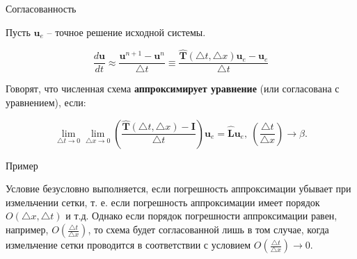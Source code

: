 \documentclass[10pt,xcolor=pst,aspectratio=169]{beamer}
\begin{document}
\begin{frame}{Согласованность}

    \transdissolve[duration=0.1]
    \justifying
    \large

    Пусть $\textbf{u}_{e}$ -- точное решение исходной системы.

    \[
        \frac{d \textbf{u}}{d t} \approx \frac{\textbf{u}^{n + 1} - \textbf{u}^{n}}{\triangle t} \equiv \frac{\hat{\textbf{T}} (\triangle t, \triangle x) \textbf{u}_{e} - \textbf{u}_{e}}{\triangle t}
    \]

    Говорят, что численная схема \textbf{аппроксимирует уравнение} (или согласована с уравнением), если:

\[
        \lim_{\triangle t \rightarrow 0} \lim_{\triangle x \rightarrow 0} \left( \frac{\hat{\textbf{T}} (\triangle t, \triangle x) - \textbf{I}}{\triangle t} \right) \textbf{u}_{e} = \hat{\textbf{L}} \textbf{u}_{e}, \: \left( \frac{\triangle t}{\triangle x} \right) \rightarrow \beta.
    \]



\end{frame}

\begin{frame}{Пример}

    \transdissolve[duration=0.1]
    \justifying
    \large

    Условие безусловно выполняется, если погрешность аппроксимации убывает при измельчении сетки, т. е. если погрешность аппроксимации имеет порядок $\mathit{O} \left( \triangle x, \triangle t \right)$ и т.д. Однако если порядок погрешности аппроксимации равен, например, $\mathit{O} \left( \frac{\triangle t}{\triangle x} \right)$, то схема будет согласованной лишь в том случае, когда измельчение сетки проводится в соответствии с условием $\mathit{O} \left( \frac{\triangle t}{\triangle x} \right) \rightarrow 0$.

\end{frame}
\end{document}
